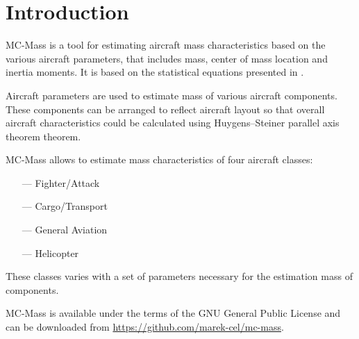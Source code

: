 \chapter{Introduction}

MC-Mass is a tool for estimating aircraft mass characteristics based on the various aircraft parameters, that includes mass, center of mass location and inertia moments. It is based on the statistical equations presented in \cite{Raymer2018,NASA-TP-2015-218751}.

Aircraft parameters are used to estimate mass of various aircraft components. These components can be arranged to reflect aircraft layout so that overall aircraft characteristics could be calculated using Huygens–Steiner parallel axis theorem theorem.

MC-Mass allows to estimate mass characteristics of four aircraft classes:
\begin{itemize}
  \item[---] Fighter/Attack
  \item[---] Cargo/Transport
  \item[---] General Aviation
  \item[---] Helicopter
\end{itemize}

These classes varies with a set of parameters necessary for the estimation mass of components.

MC-Mass is available under the terms of the GNU General Public License \cite{GNU-GPLv3} and can be downloaded from \url{https://github.com/marek-cel/mc-mass}.
